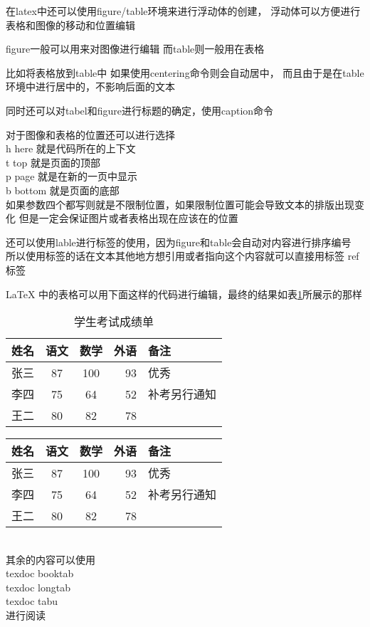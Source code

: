 \documentclass{ctexart}
\begin{document}
在latex中还可以使用figure/table环境来进行浮动体的创建，
浮动体可以方便进行表格和图像的移动和位置编辑

figure一般可以用来对图像进行编辑
而table则一般用在表格

比如将表格放到table中
如果使用centering命令则会自动居中，
而且由于是在table环境中进行居中的，不影响后面的文本

同时还可以对tabel和figure进行标题的确定，使用caption命令

对于图像和表格的位置还可以进行选择\\
h here 就是代码所在的上下文\\
t top 就是页面的顶部\\
p page 就是在新的一页中显示\\
b bottom 就是页面的底部\\
如果参数四个都写则就是不限制位置，如果限制位置可能会导致文本的排版出现变化
但是一定会保证图片或者表格出现在应该在的位置

还可以使用lable进行标签的使用，因为figure和table会自动对内容进行排序编号
所以使用标签的话在文本其他地方想引用或者指向这个内容就可以直接用标签
ref{标签}

\LaTeX{} 中的表格可以用下面这样的代码进行编辑，最终的结果如表\ref{tab-score}所展示的那样
\begin{table}[h]
    \centering   
    \caption{学生考试成绩单}\label{tab-score}
    \begin{tabular}{| l || c | c  r  p{1.5cm}}
        \hline
        姓名 & 语文 & 数学 & 外语 & 备注 \\
        \hline
        张三 & 87 & 100 & 93 & 优秀 \\
        \hline \hline
        李四 & 75 & 64 & 52 & 补考另行通知 \\
        王二 & 80 & 82 & 78 & \\
    \end{tabular}
\end{table}


    \begin{tabular}{| l || c | c  r  p{1.5cm}}
        姓名 & 语文 & 数学 & 外语 & 备注 \\
        \hline
        张三 & 87 & 100 & 93 & 优秀 \\
        \hline \hline
        李四 & 75 & 64 & 52 & 补考另行通知 \\
        王二 & 80 & 82 & 78 & \\
    \end{tabular}\\
其余的内容可以使用\\
\enspace texdoc booktab\enspace \\
\enspace texdoc longtab\enspace \\
\enspace texdoc tabu\enspace \\
进行阅读
\end{document}
